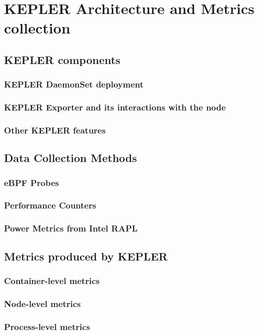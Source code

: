 \section{KEPLER Architecture and Metrics collection}
\subsection{KEPLER components}
\subsubsection{KEPLER DaemonSet deployment}
\subsubsection{KEPLER Exporter and its interactions with the node}
\subsubsection{Other KEPLER features}
\subsection{Data Collection Methods}
\subsubsection{eBPF Probes}
\subsubsection{Performance Counters}
\subsubsection{Power Metrics from Intel RAPL}
\subsection{Metrics produced by KEPLER}
\subsubsection{Container-level metrics}
\subsubsection{Node-level metrics}
\subsubsection{Process-level metrics}